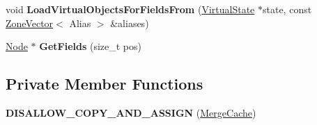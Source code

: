 \begin{DoxyCompactItemize}
\item 
void {\bfseries Load\+Virtual\+Objects\+For\+Fields\+From} (\hyperlink{classv8_1_1internal_1_1compiler_1_1_virtual_state}{Virtual\+State} $\ast$state, const \hyperlink{classv8_1_1internal_1_1_zone_vector}{Zone\+Vector}$<$ Alias $>$ \&aliases)\hypertarget{classv8_1_1internal_1_1compiler_1_1_merge_cache_a9e9adb192f654ab8b2abccf153e045b2}{}\label{classv8_1_1internal_1_1compiler_1_1_merge_cache_a9e9adb192f654ab8b2abccf153e045b2}

\item 
\hyperlink{classv8_1_1internal_1_1compiler_1_1_node}{Node} $\ast$ {\bfseries Get\+Fields} (size\+\_\+t pos)\hypertarget{classv8_1_1internal_1_1compiler_1_1_merge_cache_a2aeb7e623f4d2bc87626ef7daf171b76}{}\label{classv8_1_1internal_1_1compiler_1_1_merge_cache_a2aeb7e623f4d2bc87626ef7daf171b76}

\end{DoxyCompactItemize}
\subsection*{Private Member Functions}
\begin{DoxyCompactItemize}
\item 
{\bfseries D\+I\+S\+A\+L\+L\+O\+W\+\_\+\+C\+O\+P\+Y\+\_\+\+A\+N\+D\+\_\+\+A\+S\+S\+I\+GN} (\hyperlink{classv8_1_1internal_1_1compiler_1_1_merge_cache}{Merge\+Cache})\hypertarget{classv8_1_1internal_1_1compiler_1_1_merge_cache_ab1bd48e3d4ef9471971cef754d99cfd9}{}\label{classv8_1_1internal_1_1compiler_1_1_merge_cache_ab1bd48e3d4ef9471971cef754d99cfd9}

\end{DoxyCompactItemize}
